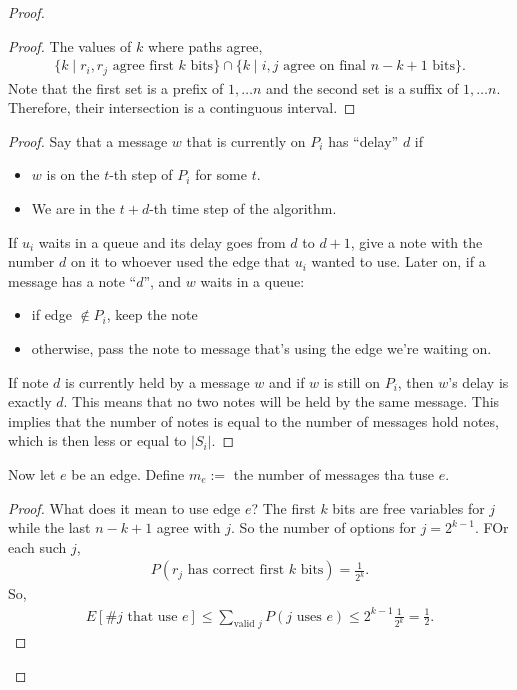 \documentclass{report}
\begin{document}
\begin{proof}
\begin{proof}
        The values of $k$ where paths agree,
        \begin{align*}
            \{ k \mid r_i, r_j \text{ agree first $k$ bits}\} \cap \{k \mid i, j \text{ agree on final $n-k+1$ bits}\}.
        \end{align*}
        Note that the first set is a prefix of $1, \ldots n$ and the second set is a suffix of $1, \ldots n$. Therefore, their intersection is a continguous interval. 
    \end{proof}
    \begin{proof}
        Say that a message $w$ that is currently on $P_i$ has ``delay'' $d$ if 
        \begin{itemize}
            \item $w$ is on the $t$-th step of $P_i$ for some $t$. 
            \item We are in the $t+d$-th time step of the algorithm.
        \end{itemize}
        If $u_i$ waits in a queue and its delay goes from $d$ to $d+1$, give a note with the number $d$ on it to whoever used the edge that $u_i$ wanted to use. Later on, if a message has a note ``$d$'', and $w$ waits in a queue:
        \begin{itemize}
            \item if edge $\notin P_i$, keep the note
            \item otherwise, pass the note to message that's using the edge we're waiting on.
        \end{itemize}
        If note $d$ is currently held by a message $w$ and if $w$ is still on $P_i$, then $w$'s delay is exactly $d$. This means that no two notes will be held by the same message. This implies that the number of notes is equal to the number of messages hold notes, which is then less or equal to $|S_i|$.
    \end{proof}
    Now let $e$ be an edge. Define $m_e :=$ the number of messages tha tuse $e$.
    \begin{proof}
        What does it mean to use edge $e$? The first $k$ bits are free variables for $j$ while the last $n-k + 1$ agree with $j$. So the number of options for $j = 2^{k-1}$. FOr each such $j$, 
        \begin{align*}
            P(r_j \text{ has correct first $k$ bits}) = \frac{1}{2^k}.
        \end{align*}
        So,
        \begin{align*}
            E[\text{\# $j$ that use $e$}] \leq \sum_{\text{valid } j} P(\text{$j$ uses $e$}) \leq 2^{k-1} \frac{1}{2^k} = \frac 12.
        \end{align*}
    \end{proof}


\end{proof}
\end{document}
